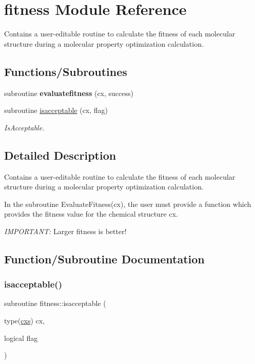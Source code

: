 \hypertarget{namespacefitness}{}\section{fitness Module Reference}
\label{namespacefitness}


Contains a user-\/editable routine to calculate the fitness of each molecular structure during a molecular property optimization calculation.  


\subsection*{Functions/\+Subroutines}
\begin{DoxyCompactItemize}
\item 
\mbox{\label{namespacefitness_ad455f723b8ddd349ac76eaa74449080f}} 
subroutine {\bfseries evaluatefitness} (cx, success)
\item 
subroutine \mbox{\hyperlink{namespacefitness_a0ff71fd8701e300b22d6210ff5701c17}{isacceptable}} (cx, flag)
\begin{DoxyCompactList}\small\item\em Is\+Acceptable. \end{DoxyCompactList}\end{DoxyCompactItemize}


\subsection{Detailed Description}
Contains a user-\/editable routine to calculate the fitness of each molecular structure during a molecular property optimization calculation. 

In the subroutine Evaluate\+Fitness(cx), the user must provide a function which provides the fitness value for the chemical structure cx.

{\itshape I\+M\+P\+O\+R\+T\+A\+NT\+:} Larger fitness is better! 

\subsection{Function/\+Subroutine Documentation}
\mbox{\label{namespacefitness_a0ff71fd8701e300b22d6210ff5701c17}} 
\subsubsection{\texorpdfstring{isacceptable()}{isacceptable()}}
{\footnotesize\ttfamily subroutine fitness\+::isacceptable (\begin{DoxyParamCaption}\item[{type(\mbox{\hyperlink{structchemstr_1_1cxs}{cxs}})}]{cx,  }\item[{logical}]{flag }\end{DoxyParamCaption})}



